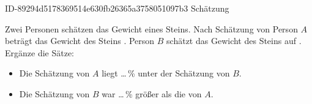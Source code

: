 \begin{exercise}
      {ID-89294d5178369514e630fb26365a3758051097b3}
      {Schätzung}
  \ifproblem\problem\par
    Zwei Personen schätzen das Gewicht eines Steins.
    Nach Schätzung von Person $A$ beträgt das Gewicht des Steins .
    Person $B$ schätzt das Gewicht des Steins auf . Ergänze die Sätze:
    \begin{itemize}
      \item Die Schätzung von $A$ liegt \ldots\,\% unter der Schätzung von $B$.
      \item Die Schätzung von $B$ war \ldots\,\% größer als die von $A$.
    \end{itemize}
  \fi
\end{exercise}
